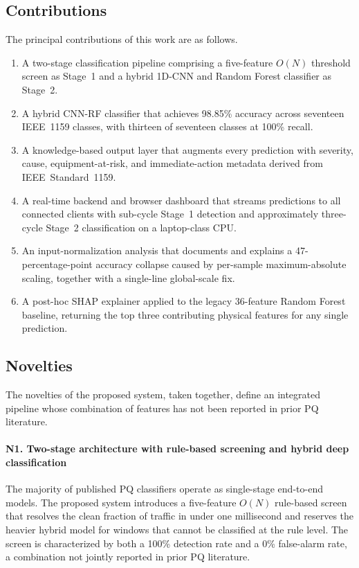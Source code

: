 \documentclass[conference]{IEEEtran}
\begin{document}
\subsection{Contributions}
The principal contributions of this work are as follows.
\begin{enumerate}
  \item A two-stage classification pipeline comprising a
        five-feature $O(N)$ threshold screen as Stage~1 and a hybrid
        1D-CNN and Random Forest classifier as Stage~2.
  \item A hybrid CNN-RF classifier that achieves 98.85\% accuracy
        across seventeen IEEE~1159 classes, with thirteen of seventeen
        classes at 100\% recall.
  \item A knowledge-based output layer that augments every prediction
        with severity, cause, equipment-at-risk, and immediate-action
        metadata derived from IEEE~Standard~1159.
  \item A real-time backend and browser dashboard that streams
        predictions to all connected clients with sub-cycle Stage~1
        detection and approximately three-cycle Stage~2 classification
        on a laptop-class CPU.
  \item An input-normalization analysis that documents and explains a
        47-percentage-point accuracy collapse caused by per-sample
        maximum-absolute scaling, together with a single-line
        global-scale fix.
  \item A post-hoc SHAP explainer applied to the legacy 36-feature
        Random Forest baseline, returning the top three contributing
        physical features for any single prediction.
\end{enumerate}

\subsection{Novelties}\label{sec:novelties}
The novelties of the proposed system, taken together, define an
integrated pipeline whose combination of features has not been reported
in prior PQ literature.

\paragraph{N1. Two-stage architecture with rule-based screening and
hybrid deep classification}
The majority of published PQ classifiers operate as single-stage
end-to-end models. The proposed system introduces a five-feature
$O(N)$ rule-based screen that resolves the clean fraction of traffic in
under one millisecond and reserves the heavier hybrid model for windows
that cannot be classified at the rule level. The screen is
characterized by both a 100\% detection rate and a 0\% false-alarm
rate, a combination not jointly reported in prior PQ literature.
\end{document}
